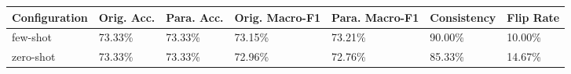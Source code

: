 \begin{tabular}{lllllll}
\toprule
Configuration & Orig. Acc. & Para. Acc. & Orig. Macro-F1 & Para. Macro-F1 & Consistency & Flip Rate \\
\midrule
few-shot & 73.33\% & 73.33\% & 73.15\% & 73.21\% & 90.00\% & 10.00\% \\
zero-shot & 73.33\% & 73.33\% & 72.96\% & 72.76\% & 85.33\% & 14.67\% \\
\bottomrule
\end{tabular}
